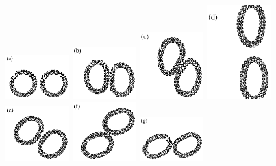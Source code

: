 \documentclass[lineno]{jfm}
\begin{document}
\begin{figure}
\begin{center}
\includegraphics[width=0.22\textwidth]{N116_ext_0.eps}
\includegraphics[width=0.22\textwidth]{N116_ext_2500.eps}
\includegraphics[width=0.22\textwidth]{N116_ext_5000.eps}
\includegraphics[width=0.22\textwidth]{N116_ext_7500.eps}\\
\includegraphics[width=0.22\textwidth]{N116_shear_3000.eps}
\includegraphics[width=0.22\textwidth]{N116_shear_6000.eps}
\includegraphics[width=0.22\textwidth]{N116_shear_9000.eps}

\end{center}
\end{figure}
\end{document}
